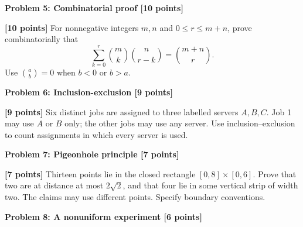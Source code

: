 \documentclass[12pt,letterpaper]{article}
\newcommand{\problemheading}[2][5\baselineskip]{\Needspace{#1}\par\noindent\hspace*{-0.625in}\textbf{#2}\par\nobreak\vspace{0.3em}}
\newcommand{\examspace}[1]{\par\vspace*{#1cm}}
\begin{document}
\problemheading{Problem 5: Combinatorial proof [10 points]}
\begin{list}{}{\setlength{\leftmargin}{0.25in}\setlength{\rightmargin}{0.25in}}\item[]
\begin{description}[font=\normalfont,leftmargin=1.2em,labelsep=0.4em]
\item[] \textbf{[10 points]} For nonnegative integers $m,n$ and $0\le r\le m+n$, prove combinatorially that\[\sum_{k=0}^{r}\binom mk\binom n{r-k}=\binom{m+n}{r}.\]Use $\binom ab=0$ when $b<0$ or $b>a$.
\examspace{7}
\end{description}
\end{list}
\clearpage
\vspace*{0.21in}
\problemheading{Problem 6: Inclusion-exclusion [9 points]}
\begin{list}{}{\setlength{\leftmargin}{0.25in}\setlength{\rightmargin}{0.25in}}\item[]
\begin{description}[font=\normalfont,leftmargin=1.2em,labelsep=0.4em]
\item[] \textbf{[9 points]} Six distinct jobs are assigned to three labelled servers $A,B,C$. Job 1 may use $A$ or $B$ only; the other jobs may use any server. Use inclusion--exclusion to count assignments in which every server is used.
\examspace{7}
\end{description}
\end{list}
\clearpage
\vspace*{0.21in}
\problemheading{Problem 7: Pigeonhole principle [7 points]}
\begin{list}{}{\setlength{\leftmargin}{0.25in}\setlength{\rightmargin}{0.25in}}\item[]
\begin{description}[font=\normalfont,leftmargin=1.2em,labelsep=0.4em]
\item[] \textbf{[7 points]} Thirteen points lie in the closed rectangle $[0,8]\times[0,6]$. Prove that two are at distance at most $2\sqrt2$, and that four lie in some vertical strip of width two. The claims may use different points. Specify boundary conventions.
\examspace{7}
\end{description}
\end{list}
\clearpage
\vspace*{0.21in}
\problemheading{Problem 8: A nonuniform experiment [6 points]}
\end{document}
